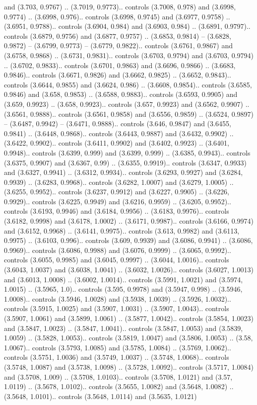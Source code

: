 and (3.703, 0.9767) .. (3.7019, 0.9773).. controls (3.7008, 0.978) and (3.6998, 0.9774) .. (3.6998, 0.976).. controls (3.6998, 0.9745) and (3.6977, 0.9758) .. (3.6951, 0.9788).. controls (3.6904, 0.984) and (3.6903, 0.984) .. (3.6891, 0.9797).. controls (3.6879, 0.9756) and (3.6877, 0.9757) .. (3.6853, 0.9814) -- (3.6828, 0.9872) -- (3.6799, 0.9773) -- (3.6779, 0.9822).. controls (3.6761, 0.9867) and (3.6758, 0.9868) .. (3.6731, 0.9831).. controls (3.6703, 0.9794) and (3.6703, 0.9794) .. (3.6702, 0.9833).. controls (3.6701, 0.9863) and (3.6696, 0.9866) .. (3.6683, 0.9846).. controls (3.6671, 0.9826) and (3.6662, 0.9825) .. (3.6652, 0.9843).. controls (3.6644, 0.9855) and (3.6624, 0.986) .. (3.6608, 0.9854).. controls (3.6585, 0.9846) and (3.658, 0.9853) .. (3.6588, 0.9883).. controls (3.6593, 0.9905) and (3.659, 0.9923) .. (3.658, 0.9923).. controls (3.657, 0.9923) and (3.6562, 0.9907) .. (3.6561, 0.9888).. controls (3.6561, 0.9858) and (3.6556, 0.9859) .. (3.6524, 0.9897) -- (3.6487, 0.9942) -- (3.6471, 0.9888).. controls (3.646, 0.9847) and (3.6455, 0.9841) .. (3.6448, 0.9868).. controls (3.6443, 0.9887) and (3.6432, 0.9902) .. (3.6422, 0.9902).. controls (3.6411, 0.9902) and (3.6402, 0.9923) .. (3.6401, 0.9948).. controls (3.6399, 0.999) and (3.6399, 0.999) .. (3.6385, 0.9943).. controls (3.6375, 0.9907) and (3.6367, 0.99) .. (3.6355, 0.9919).. controls (3.6347, 0.9933) and (3.6327, 0.9941) .. (3.6312, 0.9934).. controls (3.6293, 0.9927) and (3.6284, 0.9939) .. (3.6283, 0.9968).. controls (3.6282, 1.0007) and (3.6279, 1.0005) .. (3.6255, 0.9952).. controls (3.6237, 0.9912) and (3.6227, 0.9905) .. (3.6226, 0.9929).. controls (3.6225, 0.9949) and (3.6216, 0.9959) .. (3.6205, 0.9952).. controls (3.6193, 0.9946) and (3.6184, 0.9956) .. (3.6183, 0.9976).. controls (3.6182, 0.9998) and (3.6178, 1.0002) .. (3.6171, 0.9987).. controls (3.6166, 0.9974) and (3.6152, 0.9968) .. (3.6141, 0.9975).. controls (3.613, 0.9982) and (3.6113, 0.9975) .. (3.6103, 0.996).. controls (3.609, 0.9939) and (3.6086, 0.9941) .. (3.6086, 0.9969).. controls (3.6086, 0.9988) and (3.6076, 0.9999) .. (3.6065, 0.9992).. controls (3.6055, 0.9985) and (3.6045, 0.9997) .. (3.6044, 1.0016).. controls (3.6043, 1.0037) and (3.6038, 1.0041) .. (3.6032, 1.0026).. controls (3.6027, 1.0013) and (3.6013, 1.0008) .. (3.6002, 1.0014).. controls (3.5991, 1.0021) and (3.5974, 1.0015) .. (3.5965, 1.0).. controls (3.595, 0.9978) and (3.5947, 0.998) .. (3.5946, 1.0008).. controls (3.5946, 1.0028) and (3.5938, 1.0039) .. (3.5926, 1.0032).. controls (3.5915, 1.0025) and (3.5907, 1.0031) .. (3.5907, 1.0043).. controls (3.5907, 1.0061) and (3.5899, 1.0061) .. (3.5877, 1.0042).. controls (3.5854, 1.0023) and (3.5847, 1.0023) .. (3.5847, 1.0041).. controls (3.5847, 1.0053) and (3.5839, 1.0059) .. (3.5828, 1.0053).. controls (3.5819, 1.0047) and (3.5806, 1.0053) .. (3.58, 1.0067).. controls (3.5793, 1.0085) and (3.5785, 1.0084) .. (3.5769, 1.0062).. controls (3.5751, 1.0036) and (3.5749, 1.0037) .. (3.5748, 1.0068).. controls (3.5748, 1.0087) and (3.5738, 1.0098) .. (3.5728, 1.0092).. controls (3.5717, 1.0084) and (3.5708, 1.009) .. (3.5708, 1.0103).. controls (3.5708, 1.0121) and (3.57, 1.0119) .. (3.5678, 1.0102).. controls (3.5655, 1.0082) and (3.5648, 1.0082) .. (3.5648, 1.0101).. controls (3.5648, 1.0114) and (3.5635, 1.0121) 